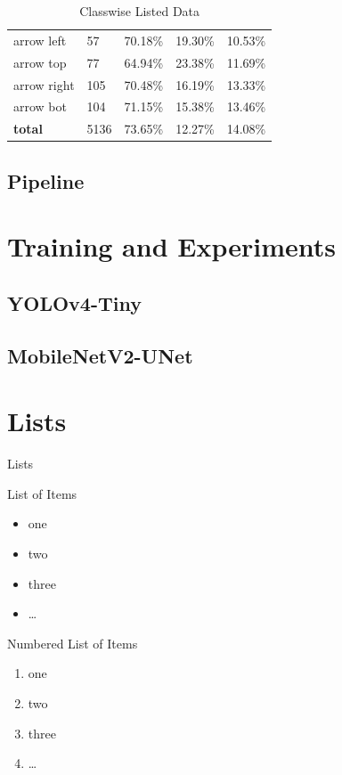 \documentclass[aspectratio=43,t]{beamer}
\begin{document}
\begin{frame}
\begin{table}
\begin{center}
\begin{tabular}{l|l|l|l|l|}
    arrow left              & 57     &  70.18\%  &   19.30\%  & 10.53\% \\
    arrow top               & 77     &  64.94\%  &   23.38\%  & 11.69\% \\
    arrow right             & 105    &  70.48\%  &   16.19\%  & 13.33\% \\
    arrow bot               & 104    &  71.15\%  &   15.38\%  & 13.46\% \\
    \hline
    \textbf{total}          & 5136   &  73.65\%  &   12.27\%  & 14.08\% \\
\end{tabular}
\caption{Classwise Listed Data}
\label{tab:yolo_classes}
\end{center}
\end{table}

\end{frame}

\subsection{Pipeline}

\section{Training and Experiments}

\subsection{YOLOv4-Tiny}

\subsection{MobileNetV2-UNet}

\section{Lists}
\begin{frame}{Lists}
\begin{block}{List of Items}
  \begin{itemize}
    \item one
    \item two
    \item three
    \item \dots
  \end{itemize}
\end{block}

\pause

\begin{block}{Numbered List of Items}
  \begin{enumerate}
    \item<2-> one
    \item<3-> two
    \item<4-> three
    \item<5-> \dots
  \end{enumerate}
\end{block}
\end{frame}
\end{document}
